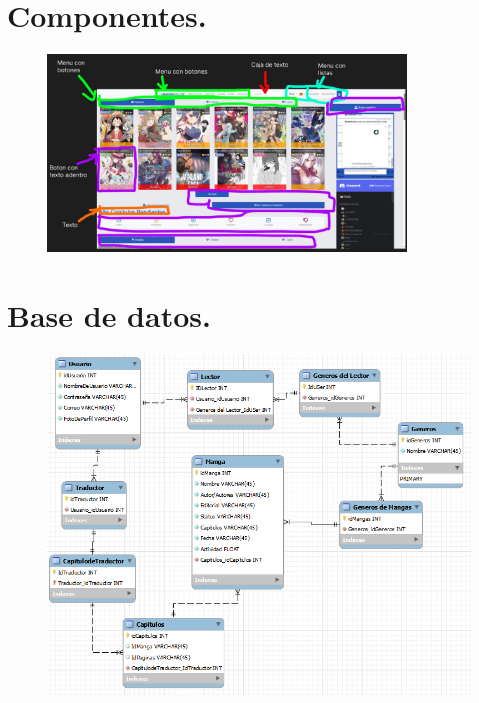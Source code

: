 \documentclass[12pt]{article}
\begin{document}
\newpage

\section{Componentes.}

\begin{figure}[htbp]
	\centering
		\includegraphics[width=0.85\textwidth]{Componentes.jpg}
	\label{fig:Componentes}
\end{figure}

\newpage

\section{Base de datos.}

\begin{figure}[htbp]
	\centering
		\includegraphics[width=1.00\textwidth]{Screenshot 2023-10-05 114250.png}
	\label{fig:Screenshot 2023-10-05 114250}
\end{figure}
\end{document}
